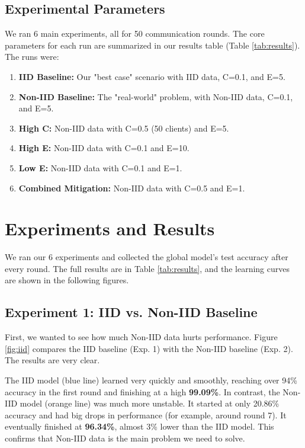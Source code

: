\documentclass[conference]{IEEEtran}
\begin{document}
\subsection{Experimental Parameters}
We ran 6 main experiments, all for 50 communication rounds. The core parameters for each run are summarized in our results table (Table \ref{tab:results}). The runs were:
\begin{enumerate}
    \item \textbf{IID Baseline:} Our "best case" scenario with IID data, C=0.1, and E=5.
    \item \textbf{Non-IID Baseline:} The "real-world" problem, with Non-IID data, C=0.1, and E=5.
    \item \textbf{High C:} Non-IID data with C=0.5 (50 clients) and E=5.
    \item \textbf{High E:} Non-IID data with C=0.1 and E=10.
    \item \textbf{Low E:} Non-IID data with C=0.1 and E=1.
    \item \textbf{Combined Mitigation:} Non-IID data with C=0.5 and E=1.
\end{enumerate}


\section{Experiments and Results}
We ran our 6 experiments and collected the global model's test accuracy after every round. The full results are in Table \ref{tab:results}, and the learning curves are shown in the following figures.

\subsection{Experiment 1: IID vs. Non-IID Baseline}
First, we wanted to see how much Non-IID data hurts performance. Figure \ref{fig:iid} compares the IID baseline (Exp. 1) with the Non-IID baseline (Exp. 2). The results are very clear.

The IID model (blue line) learned very quickly and smoothly, reaching over 94\% accuracy in the first round and finishing at a high \textbf{99.09\%}. In contrast, the Non-IID model (orange line) was much more unstable. It started at only 20.86\% accuracy and had big drops in performance (for example, around round 7). It eventually finished at \textbf{96.34\%}, almost 3\% lower than the IID model. This confirms that Non-IID data is the main problem we need to solve.
\end{document}
